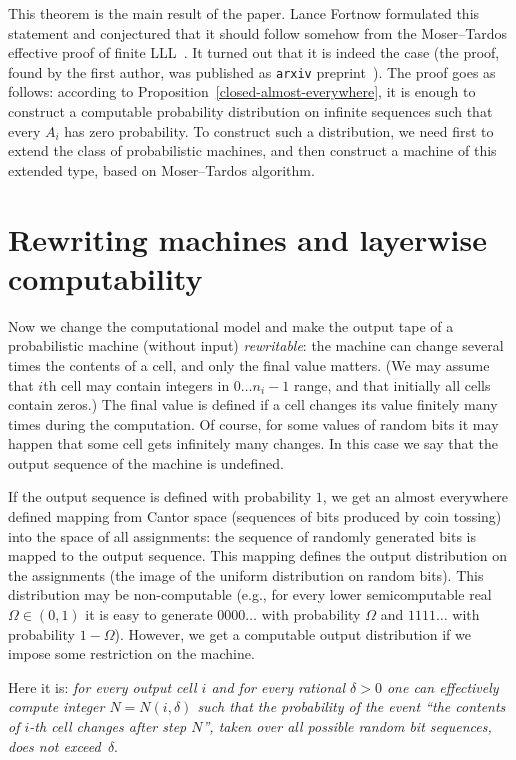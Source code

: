 \documentclass[12pt]{article}
\begin{document}
This theorem is the main result of the paper. Lance Fortnow formulated this statement and conjectured that it should follow somehow from the Moser--Tardos effective proof of finite LLL~\cite{moser-tardos}.  It turned out that it is indeed the case (the proof, found by the first author, was published as \texttt{arxiv} preprint~\cite{rumyantsev-positive}). The  proof goes as follows: according to Proposition~\ref{closed-almost-everywhere}, it is enough to construct a computable probability distribution on infinite sequences such that every $A_i$ has zero probability. To construct such a distribution, we need first to extend the class of probabilistic machines, and then construct a machine of this extended type, based on Moser--Tardos algorithm.

\section{Rewriting machines and layerwise computability}

Now we change the computational model and make the output tape of a probabilistic machine (without input) \emph{rewritable}: the machine can change several times the contents of a cell, and only the final value matters. (We may assume that $i$th cell may contain integers in $0\ldots n_i-1$ range, and that initially all cells contain zeros.) The final value is defined if a cell changes its value finitely many times during the computation. Of course, for some values of random bits it may happen that some cell gets infinitely many changes. In this case we say that the output sequence of the machine is undefined.

If the output sequence is defined with probability $1$, we get an almost everywhere defined mapping from Cantor space (sequences of bits produced by coin tossing) into the space of all assignments: the sequence of randomly generated bits is mapped to the output sequence. This mapping defines the output distribution on the assignments (the image of the uniform distribution on random bits). This distribution may be non-com\-put\-able (e.g., for every lower semicomputable real $\Omega\in(0,1)$ it is easy to generate $0000\ldots$ with probability $\Omega$ and $1111\ldots$ with probability $1-\Omega$). However, we get a computable output distribution if we impose some restriction on the machine.

Here it is: \emph{for every output cell $i$ and for every rational $\delta>0$ one can effectively compute integer $N=N(i,\delta)$ such that the probability of the event ``the contents of $i$-th cell changes after step $N$'', taken over all possible random bit sequences, does not exceed~$\delta$}.
\end{document}
